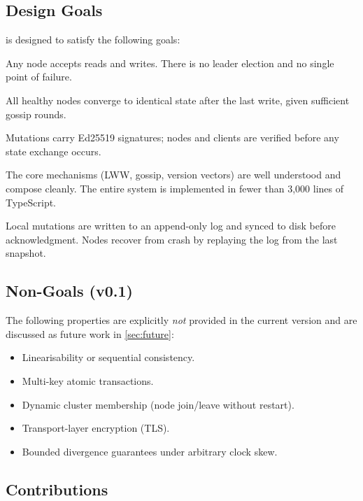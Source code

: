 \subsection{Design Goals}

\pebble{} is designed to satisfy the following goals:

\begin{description}[leftmargin=1.5em, labelwidth=3.5cm]
  \item[Leaderless.] Any node accepts reads and writes. There is no leader
        election and no single point of failure.
  \item[Eventually consistent.] All healthy nodes converge to identical state
        after the last write, given sufficient gossip rounds.
  \item[Authenticated.] Mutations carry Ed25519 signatures; nodes and clients
        are verified before any state exchange occurs.
  \item[Simple.] The core mechanisms (LWW, gossip, version vectors) are well
        understood and compose cleanly. The entire system is implemented in
        fewer than 3,000 lines of TypeScript.
  \item[Durable.] Local mutations are written to an append-only log and synced
        to disk before acknowledgment. Nodes recover from crash by replaying the
        log from the last snapshot.
\end{description}

\subsection{Non-Goals (v0.1)}

The following properties are explicitly \emph{not} provided in the current
version and are discussed as future work in \cref{sec:future}:

\begin{itemize}[leftmargin=1.5em]
  \item Linearisability or sequential consistency.
  \item Multi-key atomic transactions.
  \item Dynamic cluster membership (node join/leave without restart).
  \item Transport-layer encryption (TLS).
  \item Bounded divergence guarantees under arbitrary clock skew.
\end{itemize}

\subsection{Contributions}

